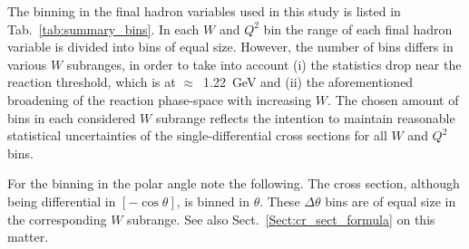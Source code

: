 The binning in the final hadron variables used in this study is listed in Tab.~\ref{tab:summary_bins}. In each $W$ and $Q^{2}$ bin the range of each final hadron variable is divided into bins of equal size. However, the number of bins differs in various $W$ subranges, in order to take into account (i) the statistics drop near the reaction threshold, which is at $\approx$~1.22~GeV and (ii) the aforementioned broadening of the reaction phase-space with increasing $W$. The chosen amount of bins in each considered $W$ subrange reflects the intention to maintain reasonable statistical uncertainties of the single-differential cross sections for all $W$ and $Q^2$ bins. 



For the binning in the polar angle note the following. The cross section, although being differential in $[-\cos\theta]$, is binned in $\theta$. These $\Delta \theta$ bins are of equal size in the corresponding $W$ subrange. See also Sect.~\ref{Sect:cr_sect_formula} on this matter.


